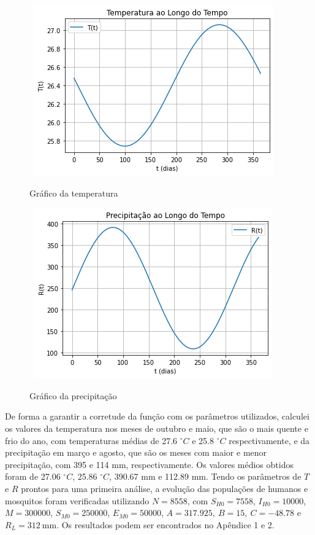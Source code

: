\documentclass[12pt]{article}
\begin{document}
\begin{figure}[!ht]
        \centering
        \hbox{\hspace{6.8em} \includegraphics[scale=0.6] {Grafico_da_Temperatura.png}}
        \caption{Gráfico da temperatura}
\end{figure} 
\newpage
\begin{figure}[!ht]
        \centering
        \hbox{\hspace{7.0em} \includegraphics[scale=0.6] {Grafico_da_Precipitacao.png}}
        \caption{Gráfico da precipitação}
\end{figure} 
De forma a garantir a corretude da função com os parâmetros utilizados, calculei os valores da temperatura nos meses de outubro e maio, que são o mais quente e frio do ano, com temperaturas médias de 27.6 $^\circ C$ e 25.8 $^\circ C$ respectivamente, e da precipitação em março e agosto, que são os meses com maior e menor precipitação, com 395 e 114 mm, respectivamente. Os valores médios obtidos foram de 27.06 $^\circ C$, 25.86 $^\circ C$, 390.67 mm e 112.89 mm. Tendo os parâmetros de $T$ e $R$ prontos para uma primeira análise, a evolução das populações de humanos e mosquitos foram verificadas utilizando $N=8558$, com $S_{H0} = 7558$, $I_{H0} = 10000$, $M= 300000$, $S_{M0}=250000$, $E_{M0} = 50000$, $A = 317.925, \ B = 15, \ C = -48.78$ e $R_L = 312 \ \text{mm}$. Os resultados podem ser encontrados no Apêndice 1 e 2. 
\end{document}

